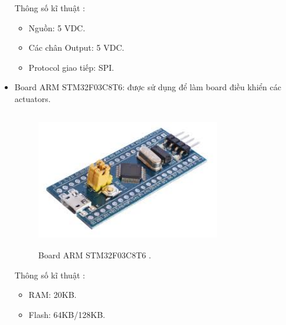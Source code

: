 \documentclass[a4paper,12pt,oneside]{article}
\begin{document}
\begin{itemize}
\noindent Thông số kĩ thuật \cite{dientuachau}:
\begin{itemize}
	\item Nguồn: 5 VDC.
	\item Các chân Output: 5 VDC.
	\item Protocol giao tiếp: SPI.
\end{itemize}


\item Board ARM STM32F03C8T6: được sử dụng để làm board điều khiển các actuators.

\begin{figure}[H]
	\centering
	\includegraphics[height=6cm,width=8cm]{hinh/stm32.jpg}
	\caption{Board ARM STM32F03C8T6 \cite{dientuachau}.}
\end{figure}

\noindent Thông số kĩ thuật \cite{dientuachau}:
\begin{itemize}
\item RAM: 20KB.
\item Flash: 64KB/128KB.
\end{itemize}


\end{itemize}
\end{document}
